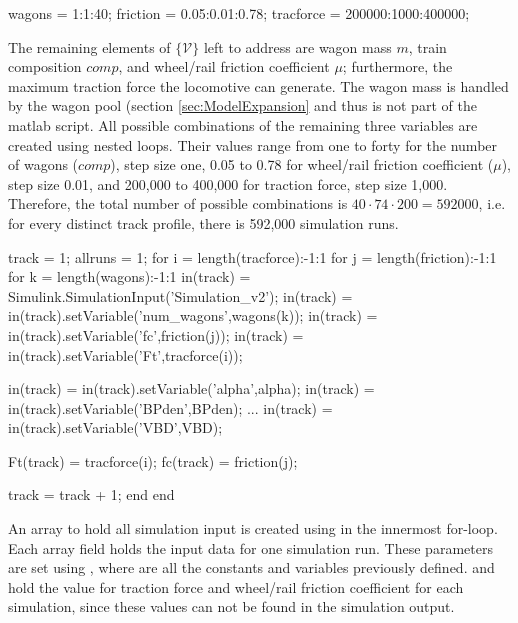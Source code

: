 \bigskip
\begin{python}
wagons = 1:1:40;
friction = 0.05:0.01:0.78;
tracforce = 200000:1000:400000;
\end{python}
\bigskip

\noindent
The remaining elements of $\{{\mathcal{V}}\}$ left to address are wagon mass $m$, train composition $comp$, and wheel/rail friction coefficient $\mu$; furthermore, the maximum traction force the locomotive can generate. The wagon mass is handled by the wagon pool (section \ref{sec:ModelExpansion} and thus is not part of the matlab script. All possible combinations of the remaining three variables are created using nested loops. Their values range from one to forty for the number of wagons ($comp$), step size one, 0.05 to 0.78 for wheel/rail friction coefficient ($\mu$), step size 0.01, and 200,000 to 400,000 for traction force, step size 1,000. Therefore, the total number of possible combinations is $40 \cdot 74 \cdot 200 = 592000$, i.e. for every distinct track profile, there is 592,000 simulation runs.   

\bigskip
\begin{python}
track = 1;
allruns = 1;
for i = length(tracforce):-1:1
	for j = length(friction):-1:1
		for k = length(wagons):-1:1
			in(track) = Simulink.SimulationInput('Simulation_v2');
			in(track) = in(track).setVariable('num_wagons',wagons(k));
			in(track) = in(track).setVariable('fc',friction(j));
			in(track) = in(track).setVariable('Ft',tracforce(i));
			
			in(track) = in(track).setVariable('alpha',alpha);
			in(track) = in(track).setVariable('BPden',BPden);
			...
			in(track) = in(track).setVariable('VBD',VBD);
			
			Ft(track) = tracforce(i);
			fc(track) = friction(j);
			
			track = track + 1;        
		end
	end
\end{python}
\bigskip

\noindent
An array to hold all simulation input is created using  in the innermost for-loop. Each array field holds the input data for one simulation run. These parameters are set using , where  are all the constants and variables previously defined.  and  hold the value for traction force and wheel/rail friction coefficient for each simulation, since these values can not be found in the simulation output.


